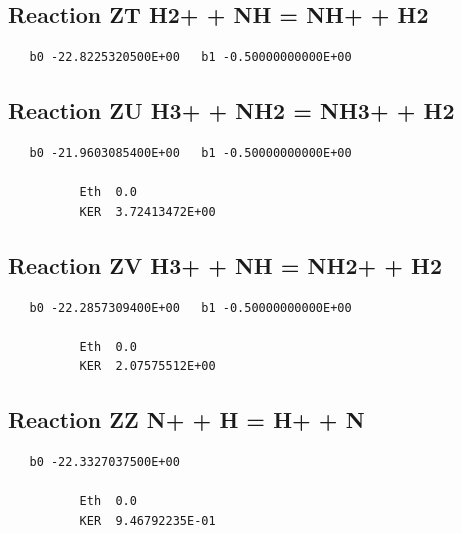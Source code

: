\documentclass[12pt]{article}
\begin{document}
\subsection{
Reaction ZT H2+ + NH = NH+ + H2 }
\begin{small}\begin{verbatim}
   b0 -22.8225320500E+00   b1 -0.50000000000E+00
\end{verbatim}\end{small}
\newpage

\subsection{
Reaction ZU H3+ + NH2 = NH3+ + H2 }
\begin{small}\begin{verbatim}
   b0 -21.9603085400E+00   b1 -0.50000000000E+00

          Eth  0.0
          KER  3.72413472E+00

\end{verbatim}\end{small}
\newpage

\subsection{
Reaction ZV H3+ + NH = NH2+ + H2 }
\begin{small}\begin{verbatim}
   b0 -22.2857309400E+00   b1 -0.50000000000E+00

          Eth  0.0
          KER  2.07575512E+00

\end{verbatim}\end{small}
\newpage

\subsection{
Reaction ZZ N+ + H = H+ + N }
\begin{small}\begin{verbatim}
   b0 -22.3327037500E+00

          Eth  0.0
          KER  9.46792235E-01

\end{verbatim}\end{small}
\newpage
\end{document}
